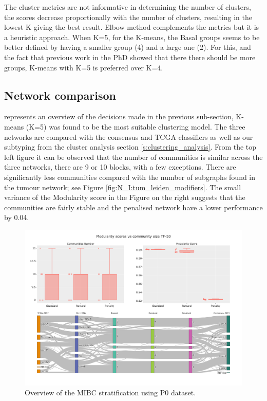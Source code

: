 The cluster metrics are not informative in determining the number of clusters, the scores decrease proportionally with the number of clusters, resulting in the lowest K giving the best result. Elbow method complements the metrics but it is a heuristic approach. When K=5, for the K-means, the Basal groups seems to be better defined by having a smaller group (4) and a large one (2). For this, and the fact that previous work in the PhD showed that there there should be more groups, K-means with K=5 is preferred over K=4.

\subsection{Network comparison}


 represents an overview of the decisions made in the previous sub-section, K-means (K=5) was found to be the most suitable clustering model. The three networks are compared with the consensus and TCGA classifiers \citet{Kamoun2020-tj, Robertson2017-mg} as well as our subtyping from the cluster analysis section \cref{s:clustering_analysis}. From the top left figure it can be observed that the number of communities is similar across the three networks, there are 9 or 10 blocks, with a few exceptions. There are significantly less communities compared with the number of subgraphs found in the tumour network; see Figure \ref{fig:N_I:tum_leiden_modifiers}. The small variance of the Modularity score in the Figure on the right suggests that the communities are fairly stable and the penalised network have a lower performance by 0.04.

\begin{figure}[!t]    
    \centering
    \includegraphics[width=1.0\textwidth,height=0.7\textheight,keepaspectratio]{Sections/Network_I/Resources/P0/Ldn_Sky_TF_50_RawKMeans_K5_v3.png}
    \caption{Overview of the MIBC stratification using P0 dataset.}
    \label{fig:N_I:p0_sky_leiden}
\end{figure}

